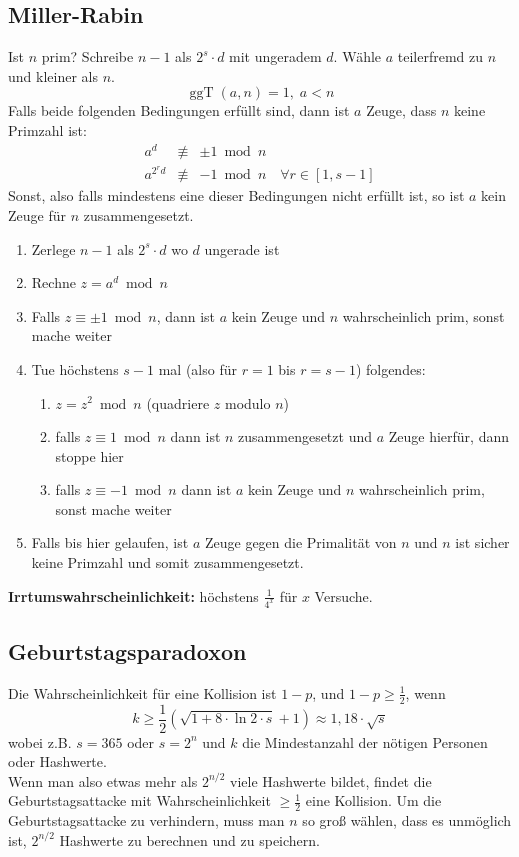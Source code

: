 \documentclass[8pt,a4paper,landscape]{article}
\begin{document}
\begin{multicols}{4}
\subsection{Miller-Rabin}
Ist $n$ prim? Schreibe $n-1$ als $2^{s}\cdot d$ mit ungeradem $d$.
Wähle $a$ teilerfremd zu $n$ und kleiner als $n$. 
\[\operatorname{ggT}(a, n) = 1, \; a<n\]
Falls beide folgenden Bedingungen erfüllt sind, dann ist $a$ Zeuge,
dass $n$ keine Primzahl ist:
\begin{eqnarray}
a^{d} &\not\equiv& \pm 1 \bmod n \nonumber\\
a^{2^{r}d} &\not\equiv& -1 \bmod n \quad \forall r \in [1,s-1]\nonumber
\end{eqnarray}
Sonst, also falls mindestens eine dieser Bedingungen nicht erfüllt ist, so ist $a$ kein Zeuge für $n$ zusammengesetzt. 
\begin{enumerate}[itemsep=1pt] 
    \item Zerlege $n-1$ als $2^{s} \cdot d$ wo $d$ ungerade ist
    \item Rechne $z = a^d \bmod n$
    \item Falls $z \equiv \pm 1 \bmod n$, dann ist $a$ kein Zeuge und $n$
          wahrscheinlich prim, sonst mache weiter
    \item Tue höchstens $s-1$ mal (also für $r=1$ bis $r=s-1$) folgendes:
          \begin{enumerate}[itemsep=1pt] 
              \item $z = z^2 \bmod n$ (quadriere $z$ modulo $n$)
              \item falls $z \equiv 1 \bmod n$ dann ist $n$ zusammengesetzt und $a$ Zeuge hierfür, dann stoppe hier
              \item falls $z \equiv -1 \bmod n$ dann ist $a$ kein Zeuge und $n$ wahrscheinlich prim, sonst mache weiter
          \end{enumerate}
    \item Falls bis hier gelaufen, ist $a$ Zeuge gegen die Primalität von
          $n$ und $n$ ist sicher keine Primzahl und somit zusammengesetzt.
\end{enumerate}
\textbf{Irrtumswahrscheinlichkeit:} höchstens $\frac{1}{4^x}$ für $x$ Versuche.

\subsection{Geburtstagsparadoxon}
Die Wahrscheinlichkeit für eine Kollision ist $1-p$, und $1-p \geq \frac{1}{2}$, wenn 
\[
k \geq  \frac{1}{2} \left( \sqrt{1 + 8 \cdot \ln 2 \cdot s} + 1 \right) \approx 1,18 \cdot \sqrt{s}  
\]
wobei z.B. $s=365$ oder $s=2^n$ und $k$ die Mindestanzahl der nötigen Personen oder Hashwerte. \\
Wenn man also etwas mehr als $2^{n/2}$ viele Hashwerte bildet, findet die Geburtstagsattacke mit Wahrscheinlichkeit $\geq \frac{1}{2}$ eine Kollision. Um die Geburtstagsattacke zu verhindern, muss man $n$ so groß wählen, dass es unmöglich ist, $2^{n/2}$ Hashwerte zu berechnen und zu speichern.

\end{multicols}
\end{document}
